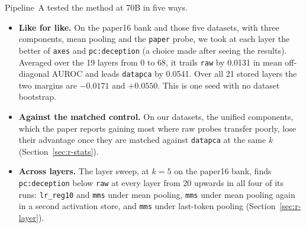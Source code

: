 Pipeline~A tested the method at 70B in five ways.
\begin{itemize}
\item \textbf{Like for like.} On the paper16 bank and those five datasets, with three components, mean pooling and the \texttt{paper} probe, we took at each layer the better of \texttt{axes} and \texttt{pc:deception} (a choice made after seeing the results). %
Averaged over the 19 layers from 0 to 68, it trails \texttt{raw} by 0.0131 in mean off-diagonal AUROC and leads \texttt{datapca} by 0.0541. %
Over all 21 stored layers the two margins are $-0.0171$ and $+0.0550$. %
This is one seed with no dataset bootstrap. %
\item \textbf{Against the matched control.} On our datasets, the unified components, which the paper reports gaining most where raw probes transfer poorly, lose their advantage once they are matched against \texttt{datapca} at the same $k$ (Section~\ref{sec:r-stats}). %
\item \textbf{Across layers.} The layer sweep, at $k=5$ on the paper16 bank, finds \texttt{pc:deception} below \texttt{raw} at every layer from 20 upwards in all four of its runs: \texttt{lr\_reg10} and \texttt{mms} under mean pooling, \texttt{mms} under mean pooling again in a second activation store, and \texttt{mms} under last-token pooling (Section~\ref{sec:r-layer}). %

\end{itemize}
